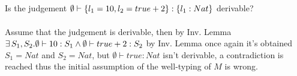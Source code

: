 \subsection{}

Is the judgement $\emptyset \vdash \{l_1 = 10, l_2 = true + 2\}: \{l_1: Nat\}$ derivable?\\~\\
Assume that the judgement is derivable, then by Inv. Lemma
$\exists\, S_1, S_2. \emptyset \vdash 10: S_1 \wedge \emptyset \vdash true+2: S_2$
by Inv. Lemma once again it's obtained $S_1 = Nat$ and $S_2 = Nat$, but
$\emptyset \vdash true: Nat$ isn't derivable, a contradiction is reached thus the initial
assumption of the well-typing of $M$ is wrong.
